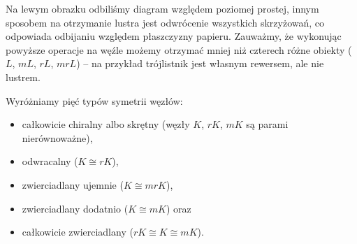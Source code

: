 Na lewym obrazku odbiliśmy diagram względem poziomej prostej, innym sposobem na otrzymanie lustra jest odwrócenie wszystkich skrzyżowań, co odpowiada odbijaniu względem płaszczyzny papieru.
Zauważmy, że wykonując powyższe operacje na węźle możemy otrzymać mniej niż czterech różne obiekty ($L$, $mL$, $rL$, $mrL$) -- na przykład trójlistnik jest własnym rewersem, ale nie lustrem.

\begin{definition}
    Wyróżniamy pięć typów symetrii węzłów:
    \begin{itemize}
        \item całkowicie chiralny albo skrętny (węzły $K$, $rK$, $mK$ są parami nierównoważne), %
        \item odwracalny ($K \cong rK$), %
        \item zwierciadlany ujemnie ($K \cong mrK$), %
        \item zwierciadlany dodatnio ($K \cong mK$) oraz %
        \item całkowicie zwierciadlany ($rK \cong K \cong mK$). %
    \end{itemize}
\end{definition}

